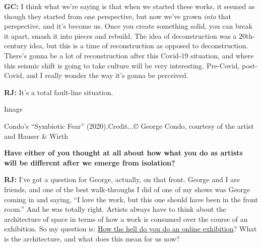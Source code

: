 \textbf{GC:} I think what we're saying is that when we started these
works, it seemed as though they started from one perspective, but now
we've grown \emph{into} that perspective, and it's become us. Once you
create something solid, you can break it apart, smash it into pieces and
rebuild. The idea of deconstruction was a 20th-century idea, but this is
a time of reconstruction as opposed to deconstruction. There's gonna be
a lot of reconstruction after this Covid-19 situation, and where this
seismic shift is going to take culture will be very interesting.
Pre-Covid, post-Covid, and I really wonder the way it's gonna be
perceived.

\textbf{RJ:} It's a total fault-line situation.

Image

Condo's ``Symbiotic Fear'' (2020).Credit...© George Condo, courtesy of
the artist and Hauser \& Wirth

\textbf{Have either of you thought at all about how what you do as
artists will be different after we emerge from isolation?}

\textbf{RJ:} I've got a question for George, actually, on that front.
George and I are friends, and one of the best walk-throughs I did of one
of my shows was George coming in and saying, ``I love the work, but this
one should have been in the front room.'' And he was totally right.
Artists always have to think about the architecture of space in terms of
how a work is consumed over the course of an exhibition. So my question
is:
\href{https://www.nytimes3xbfgragh.onion/2020/03/16/arts/design/art-galleries-online-viewing-coronavirus.html}{How
the hell do you do an online exhibition}? What is the architecture, and
what does this mean for us now?

